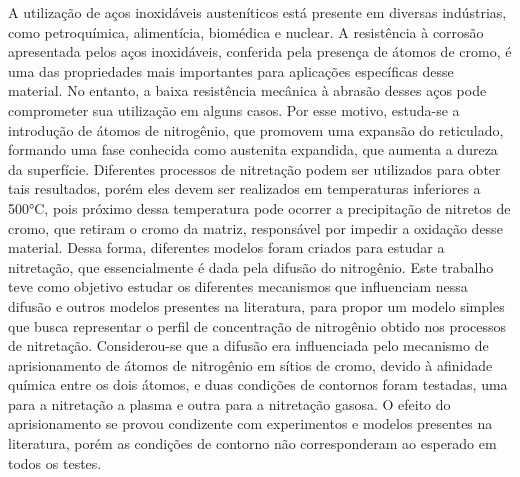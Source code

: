 A utilização de aços inoxidáveis austeníticos está presente em diversas indústrias, como petroquímica, alimentícia, biomédica e nuclear. A resistência à corrosão apresentada pelos aços inoxidáveis, conferida pela presença de átomos de cromo, é uma das propriedades mais importantes para aplicações específicas desse material. No entanto, a baixa resistência mecânica à abrasão desses aços pode comprometer sua utilização em alguns casos. Por esse motivo, estuda-se a introdução de átomos de nitrogênio, que promovem uma expansão do reticulado, formando uma fase conhecida como austenita expandida, que aumenta a dureza da superfície. Diferentes processos de nitretação podem ser utilizados para obter tais resultados, porém eles devem ser realizados em temperaturas inferiores a 500°C, pois próximo dessa temperatura pode ocorrer a precipitação de nitretos de cromo, que retiram o cromo da matriz, responsável por impedir a oxidação desse material. Dessa forma, diferentes modelos foram criados para estudar a nitretação, que essencialmente é dada pela difusão do nitrogênio. Este trabalho teve como objetivo estudar os diferentes mecanismos que influenciam nessa difusão e outros modelos presentes na literatura, para propor um modelo simples que busca representar o perfil de concentração de nitrogênio obtido nos processos de nitretação. Considerou-se que a difusão era influenciada pelo mecanismo de aprisionamento de átomos de nitrogênio em sítios de cromo, devido à afinidade química entre os dois átomos, e duas condições de contornos foram testadas, uma para a nitretação a plasma e outra para a nitretação gasosa. O efeito do aprisionamento se provou condizente com experimentos e modelos presentes na literatura, porém as condições de contorno não corresponderam ao esperado em todos os testes.